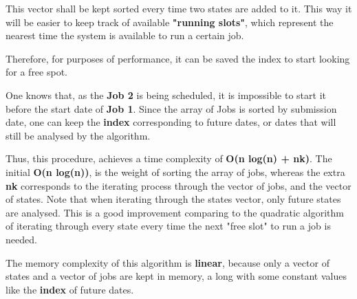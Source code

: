 \documentclass{scrreprt}
\begin{document}
\par This vector shall be kept sorted every time two states are added to it. This way it will be easier to keep track of available \textbf{"running slots"}, which represent the nearest time the system is available to run a certain job.
\par Therefore, for purposes of performance, it can be saved the index to start looking for a free spot.
\par One knows that, as the \textbf{Job 2} is being scheduled, it is impossible to start it before the start date of \textbf{Job 1}. Since the array of Jobs is sorted by submission date, one can keep the \textbf{index} corresponding to future dates, or dates that will still be analysed by the algorithm. 
\par Thus, this procedure, achieves a time complexity of \textbf{O(n log(n) + nk)}. The initial \textbf{O(n log(n))}, is the weight of sorting the array of jobs, whereas the extra \textbf{nk} corresponds to the iterating process through the vector of jobs, and the vector of states. Note that when iterating through the states vector, only future states are analysed. This is a good improvement comparing to the quadratic algorithm of iterating through every state every time the next "free slot" to run a job is needed.
\par The memory complexity of this algorithm is \textbf{linear}, because only a vector of states and a vector of jobs are kept in memory, a long with some constant values like the \textbf{index} of future dates.
\end{document}
